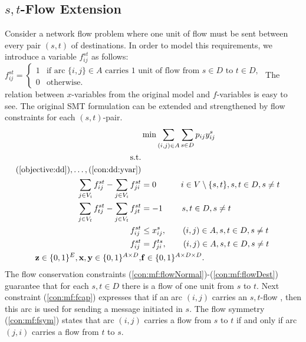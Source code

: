 \subsection{$s,t$-Flow Extension}
Consider a network flow problem where one unit of flow must be sent between every pair  $(s,t)$ of destinations. In order to model this requirements, we introduce a variable $f^{st}_{ij}$ as follows:
\newline\newline
  $f_{ij}^{st}=
	\begin{cases}
    1 & \text{if arc $\{i,j\} \in A$ carries 1 unit of flow from $s\in D$ to $t\in D$},\\
    0 & \text{otherwise}.
  \end{cases}$
\newline\newline
The relation between $x$-variables from the original model and $f$-variables is easy to see.
The original SMT formulation can be extended and strengthened by flow constraints for each $(s,t)$-pair.
\newline
\newline    
\begin{subequations}
\begin{flalign}
\label{objective:dd} \makebox[0pt][l]{$\displaystyle{} \min \sum\limits_{(i,j) \in A} \sum\limits_{s \in D} p_{ij} y^s_{ij} $}  \\ 
\text{s.t.}    \notag   \\	
(\ref{objective:dd}),\dots,(\ref{con:dd:yvar}) \notag \\ 
 \label{con:mf:flowNormal}  \sum\limits_{\substack{ j\in V_i}}f^{st}_{ij}-\sum\limits_{\substack{j\in V_i }}f^{st}_{ji}    & = 0   \quad \quad\quad 			  i\in V\setminus\{s,t\}, s,t\in D, s \neq t &\\	
\label{con:mf:flowDest}  \sum\limits_{\substack{ j\in V_t }}f^{st}_{tj}-\sum\limits_{\substack{j\in V_t}}f^{st}_{jt}    & = -1  \quad\quad ~ s,t\in D, s \neq t &\\	
 \label{con:mf:fcap}   f^{st}_{ij} &\leq  x^{s}_{ij},\quad\quad    (i,j)\in A,  s,t\in D, s \neq t  & \\ 		 			 	 
 \label{con:mf:fsym}   f^{st}_{ij} &=  f^{ts}_{ji},  \quad\quad(i,j)\in A,  s,t\in D, s \neq t  &\\   	
\label{con:mf:xydim}	\mathbf{z} \in \{0,1\}^{E}, \mathbf{x},\mathbf{y}\in \{0,1\}^{A\times D}, & \mathbf{f}\in\{0,1\}^{A\times D\times D}. 
\end{flalign}~
\end{subequations}  
The flow conservation constraints (\ref{con:mf:flowNormal})-(\ref{con:mf:flowDest}) guarantee that for each $s,t\in D$ there is a flow of one unit from $s$ to $t$. Next constraint (\ref{con:mf:fcap}) expresses that if an arc $(i,j)$ carries an $s,t$-flow , then this arc is used for sending a message initiated in $s$. The flow symmetry (\ref{con:mf:fsym}) states that arc $(i,j)$ carries a flow from $s$ to $t$ if and only if arc $(j,i)$ carries a flow from $t$ to $s$.

